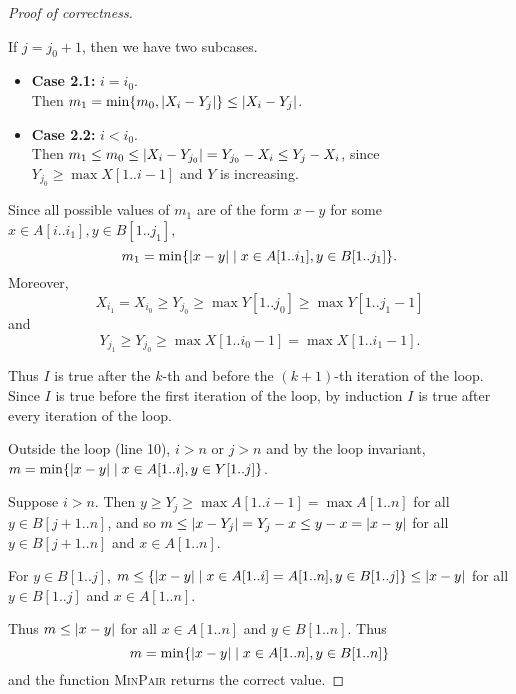 \documentclass[12pt]{article}
\begin{document}
\begin{solution}
\begin{enumerate}[wide]
\begin{proof}[Proof of correctness]
\begin{itemize}
                        If $j = j_0 + 1$, then we have two subcases.
                        \begin{itemize}
                            \item \textbf{Case 2.1:} $i = i_0$. \\
                                Then $m_1 = \min\set{m_0, \abs{X_{i} - Y_{j}}} \leq \abs{X_{i} - Y_{j}}$.
                            \item \textbf{Case 2.2:} $i < i_0$. \\
                                Then $m_1 \leq m_0 \leq \abs{X_{i} - Y_{j_0}} = Y_{j_0} - X_{i} \leq Y_{j} - X_{i}$,
                                since $Y_{j_0} \geq \max X[1..i-1]$ and $Y$ is increasing.
                        \end{itemize}
                        Since all possible values of $m_1$ are of the form $x - y$
                        for some $x \in A[i..i_1], y \in B[1..j_1]$, \[
                            m_1 = \min\set{\abs{x - y} \mid x \in A[1..i_1], y \in B[1..j_1]}.
                        \] Moreover, \[
                            X_{i_1} = X_{i_0} \geq Y_{j_0} \geq \max Y[1..j_0] \geq \max Y[1..j_1-1]
                        \] and \[
                            Y_{j_1} \geq Y_{j_0} \geq \max X[1..i_0-1] = \max X[1..i_1-1].
                        \]
                \end{itemize}
                Thus $I$ is true after the $k$-th and before the $(k+1)$-th
                iteration of the loop.
                Since $I$ is true before the first iteration of the loop,
                by induction $I$ is true after every iteration of the loop.

                Outside the loop (line 10), $i > n$ or $j > n$ and by the loop invariant,
                $m = \min\set{\abs{x - y} \mid x \in A[1..i], y \in Y[1..j]}$.

                Suppose $i > n$.
                Then $y \geq Y_{j} \geq \max A[1..i-1] = \max A[1..n]$
                for all $y \in B[j+1..n]$, and so
                $m \leq \abs{x - Y_{j}} = Y_{j} - x \leq y - x = \abs{x - y}$
                for all $y \in B[j+1..n]$ and $x \in A[1..n]$.

                For $y \in B[1..j]$,
                $m \leq \set{\abs{x - y} \mid x \in A[1..i] = A[1..n], y \in B[1..j]} \leq \abs{x - y}$
                for all $y \in B[1..j]$ and $x \in A[1..n]$.

                Thus $m \leq \abs{x - y}$ for all $x \in A[1..n]$ and $y \in B[1..n]$.
                Thus \[
                    m = \min\set{\abs{x - y} \mid x \in A[1..n], y \in B[1..n]}
                \]
                and the function \textsc{MinPair} returns the correct value.


\end{proof}
\end{enumerate}
\end{solution}
\end{document}

